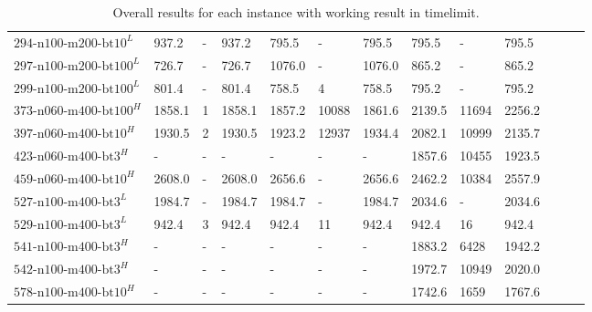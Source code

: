 \begin{landscape}
\begin{table}
\begin{tabular}{llllllllllrrr}
			$\text{294-n100-m200-bt10}^L$  & 937.2                            & -                                  & 937.2                             & 795.5  & -     & 795.5  & 795.5  & -     & 795.5  \\
			$\text{297-n100-m200-bt100}^L$ & 726.7                            & -                                  & 726.7                             & 1076.0 & -     & 1076.0 & 865.2  & -     & 865.2  \\
			$\text{299-n100-m200-bt100}^L$ & 801.4                            & -                                  & 801.4                             & 758.5  & 4     & 758.5  & 795.2  & -     & 795.2  \\
			$\text{373-n060-m400-bt100}^H$ & 1858.1                           & 1                                  & 1858.1                            & 1857.2 & 10088 & 1861.6 & 2139.5 & 11694 & 2256.2 \\
			$\text{397-n060-m400-bt10}^H$  & 1930.5                           & 2                                  & 1930.5                            & 1923.2 & 12937 & 1934.4 & 2082.1 & 10999 & 2135.7 \\
			$\text{423-n060-m400-bt3}^H$   & -                                & -                                  & -                                 & -      & -     & -      & 1857.6 & 10455 & 1923.5 \\
			$\text{459-n060-m400-bt10}^H$  & 2608.0                           & -                                  & 2608.0                            & 2656.6 & -     & 2656.6 & 2462.2 & 10384 & 2557.9 \\
			$\text{527-n100-m400-bt3}^L$   & 1984.7                           & -                                  & 1984.7                            & 1984.7 & -     & 1984.7 & 2034.6 & -     & 2034.6 \\
			$\text{529-n100-m400-bt3}^L$   & 942.4                            & 3                                  & 942.4                             & 942.4  & 11    & 942.4  & 942.4  & 16    & 942.4  \\
			$\text{541-n100-m400-bt3}^H$   & -                                & -                                  & -                                 & -      & -     & -      & 1883.2 & 6428  & 1942.2 \\
			$\text{542-n100-m400-bt3}^H$   & -                                & -                                  & -                                 & -      & -     & -      & 1972.7 & 10949 & 2020.0 \\
			$\text{578-n100-m400-bt10}^H$  & -                                & -                                  & -                                 & -      & -     & -      & 1742.6 & 1659  & 1767.6 \\
			\bottomrule
		\end{tabular}
		\caption{Overall results for each instance with working result in timelimit.}
		\label{tab:overall_krebs_results_model}
	\end{table}
\end{landscape}